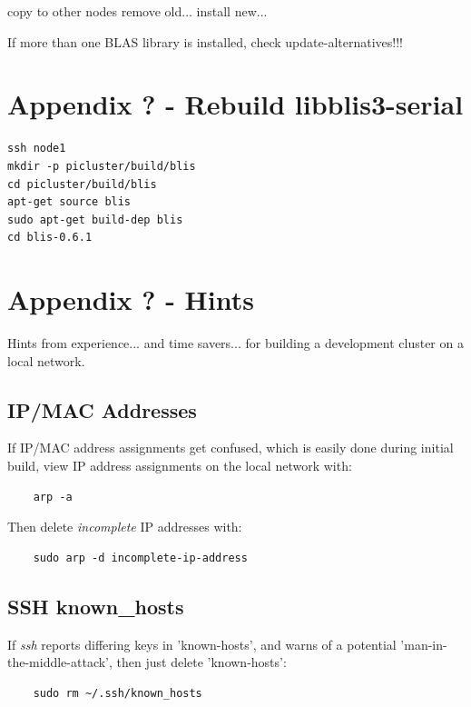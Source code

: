 \documentclass{article}
\begin{document}
copy to other nodes
remove old...
install new...

If more than one BLAS library is installed, check update-alternatives!!!


%
%
\clearpage\section*{Appendix ? - Rebuild libblis3-serial}

\lstset{style=termstyle}
\begin{lstlisting}
ssh node1
mkdir -p picluster/build/blis
cd picluster/build/blis
apt-get source blis
sudo apt-get build-dep blis
cd blis-0.6.1
\end{lstlisting}



%
%
\clearpage\section*{Appendix ? - Hints}

Hints from experience... and time savers... for building a development cluster on a local network.

\subsection{IP/MAC Addresses}
If IP/MAC address assignments get confused, which is easily done during initial build, view IP address assignments on the local network with:

\begin{verbatim}
    arp -a
\end{verbatim}

Then delete \emph{incomplete} IP addresses with:

\begin{verbatim}
    sudo arp -d incomplete-ip-address
\end{verbatim}

\subsection{SSH known\_hosts}
If \emph{ssh} reports differing keys in 'known-hosts', and warns of a potential 'man-in-the-middle-attack', then just delete 'known-hosts':

\begin{verbatim}
    sudo rm ~/.ssh/known_hosts
\end{verbatim}
\end{document}

